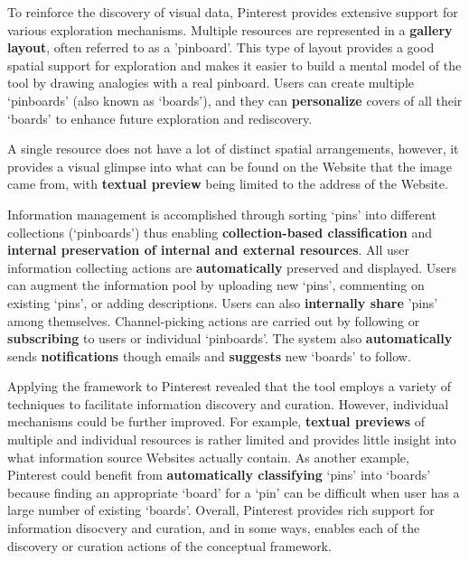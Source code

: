 {To reinforce the discovery of visual data, Pinterest provides extensive support for various exploration mechanisms. Multiple resources are represented in a \textbf{gallery layout}, often referred to as a 'pinboard'. This type of layout provides a good spatial support for exploration and makes it easier to build a mental model of the tool by drawing analogies with a real pinboard. Users can create multiple `pinboards' (also known as `boards'), and they can \textbf{personalize} covers of all their `boards' to enhance future exploration and rediscovery.

A single resource does not have a lot of distinct spatial arrangements, however, it provides a visual glimpse into what can be found on the Website that the image came from, with \textbf{textual preview} being limited to the address of the Website. 

Information management is accomplished through sorting `pins' into different collections (`pinboards') thus enabling \textbf{collection-based classification} and \textbf{internal preservation of internal and external resources}. All user information collecting actions are \textbf{automatically} preserved and displayed. Users can augment the information pool by uploading new `pins', commenting on existing `pins', or adding descriptions. Users can also \textbf{internally share} 'pins' among themselves. Channel-picking actions are carried out by following or \textbf{subscribing} to users or individual `pinboards'. The system also \textbf{automatically} sends \textbf{notifications} though emails and \textbf{suggests} new `boards' to follow.

Applying the framework to Pinterest revealed that the tool employs a  variety of techniques to facilitate information discovery and curation. However, individual mechanisms could be further improved. For example, \textbf{textual previews} of multiple and individual resources is rather limited and provides little insight into what information source Websites actually contain. As another example, Pinterest could benefit from \textbf{automatically classifying} `pins' into `boards' because finding an appropriate `board' for a `pin' can be difficult when user has a large number of existing `boards'. Overall, Pinterest provides rich support for information disocvery and curation, and in some ways, enables each of the discovery or curation actions of the conceptual framework. 
} %


